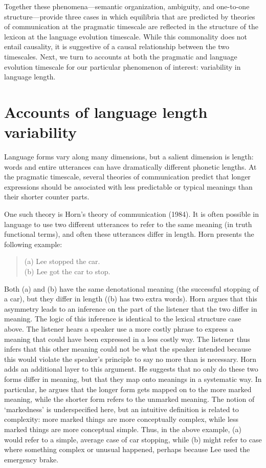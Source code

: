 \documentclass[man]{apa2}
\begin{document}
Together these phenomena---semantic organization, ambiguity, and one-to-one structure---provide three cases in which equilibria  that are predicted by theories of communication at the pragmatic timescale are reflected in the structure of the lexicon at the language evolution timescale. While this commonality does not entail causality, it is suggestive of a causal relationship between the two timescales. Next, we turn to accounts at both the pragmatic and language evolution timescale for our particular phenomenon of interest: variability in language length.

\section{Accounts of language length variability}

Language forms vary along many dimensions, but a salient dimension is length: words and entire utterances can have dramatically different phonetic lengths. At the pragmatic timescale, several theories of communication predict that  longer expressions should be associated with less predictable or typical meanings than their shorter counter parts.

One such theory is Horn's theory of communication (1984). It is often possible in language to use two different utterances to refer to the same meaning (in truth functional terms), and often these utterances differ in length. Horn presents the following example: 
\begin{quote} 
 	(a) Lee stopped the car.\\
	(b) Lee got the car to stop.
	
\end{quote}
Both (a) and (b) have the same denotational meaning (the successful stopping of a car), but they differ in length ((b) has two extra words). Horn argues that this asymmetry leads to an inference on the part of the listener that the two differ in meaning. The logic of this inference is  identical to the lexical structure case above. The listener hears a speaker use a more costly phrase to express a meaning that could have been expressed in a less costly way. The listener thus infers that this other meaning could not be what the speaker intended because this would violate the speaker's principle to say no more than is necessary. Horn adds an additional layer to this argument. He suggests that no only do these two forms differ in meaning, but that they map onto meanings in a systematic way. In particular, he argues that the longer form gets mapped on to the more marked meaning, while the shorter form refers to the unmarked meaning.  The notion of `markedness' is underspecified here, but an intuitive definition is related to complexity: more marked things are more conceptually complex, while less marked things are more conceptual simple.  Thus, in the above example, (a) would refer to a simple, average case of car stopping, while (b) might refer to case where something complex or unusual happened, perhaps because Lee used the emergency brake.
\end{document}
